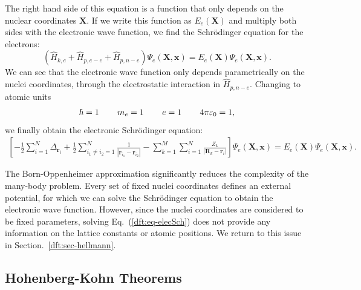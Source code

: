 \begin{refsection}
The right hand side of this equation is a function that only depends on the 
nuclear coordinates $\mathbf{X}$. If we write this function as 
$E_e(\mathbf{X})$ and multiply both sides with the electronic wave function, 
we find the Schr\"odinger equation for the electrons: 
\begin{equation} 
(\hat{H}_{k,e} + \hat{H}_{p,e-e} + \hat{H}_{p,n-e})\Psi_e(\mathbf{X}, 
\mathbf{x}) = E_e(\mathbf{X}) \Psi_e(\mathbf{X}, \mathbf{x}). 
\end{equation} 
We can see that the electronic wave function only depends parametrically on 
the nuclei coordinates, through the electrostatic interaction in 
$\hat{H}_{p,n-e}$. Changing to atomic units 
\begin{equation}\label{dft:eq-atomic} 
\hbar = 1 \hspace{0.3in} m_e = 1\hspace{0.3in} e  = 1 \hspace{0.3in} 4 \pi 
\varepsilon_0 = 1, 
\end{equation}  
we finally obtain the electronic Schr\"odinger equation: 
\begin{equation}\label{dft:eq-elecSch} 
\begin{gathered} 
\left[ -\frac{1}{2}\sum_{i=1}^N \Delta_{\mathbf{r}_i} + \frac{1}{2} \sum_{i_1 
\neq i_2 = 1}^N \frac{1}{|\mathbf{r}_{i_1}-\mathbf{r}_{i_2}|} - \sum_{k=1}^M 
\sum_{i=1}^N \frac{Z_k}{|\mathbf{R}_{k}-\mathbf{r}_{i}|} \right] 
\Psi_e(\mathbf{X}, \mathbf{x}) = E_e(\mathbf{X}) \Psi_e(\mathbf{X}, 
\mathbf{x}). 
\end{gathered} 
\end{equation} 
 
The Born-Oppenheimer approximation significantly reduces the complexity of the 
many-body problem. Every set of fixed nuclei coordinates defines an external 
potential, for which we can solve the Schr\"odinger equation to obtain the 
electronic wave function. However, since the nuclei coordinates are considered 
to be fixed parameters, solving Eq.~(\ref{dft:eq-elecSch}) does not provide any 
information on the lattice constants or atomic positions. We return to this 
issue in Section.~\ref{dft:sec-hellmann}.
 
\subsection{Hohenberg-Kohn Theorems}\label{dft:sec-HKtheorems} 
 

\end{refsection}
